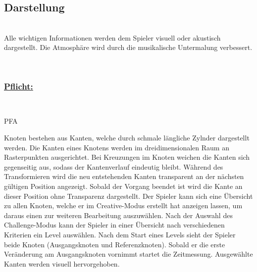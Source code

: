 %
%


\subsection{Darstellung}

%
%
\renewcommand{\K}{}
%
%

~\\
Alle wichtigen Informationen werden dem Spieler visuell oder akustisch dargestellt. Die Atmosphäre wird durch die musikalische Untermalung verbessert.

\\

%
%
\subsubsection*{\underline{Pflicht:}}~\\

\begin{ids}{\gls{PFA\K}}

	\id[ 280] Knoten bestehen aus Kanten, welche durch schmale längliche Zylnder dargestellt werden.
	\id[ 290] Die Kanten eines Knotens werden im dreidimensionalen Raum an Rasterpunkten ausgerichtet.
	\id[ 300] Bei Kreuzungen im Knoten weichen die Kanten sich gegenseitig aus, sodass der Kantenverlauf eindeutig bleibt.
	\id[ 310] Während des Transformieren wird die neu entstehenden Kanten transparent an der nächsten gültigen Position angezeigt. Sobald der Vorgang beendet ist wird die Kante an dieser Position ohne Transparenz dargestellt.
	\id[ 320] Der Spieler kann sich eine Übersicht zu allen Knoten, welche er im Creative-Modus erstellt hat anzeigen lassen, um daraus einen zur weiteren Bearbeitung auszuwählen.
	\id[ 330] Nach der Auswahl des Challenge-Modus kann der Spieler in einer Übersicht nach verschiedenen Kriterien ein Level auswählen.
	\id[ 340] Nach dem Start eines Levels sieht der Spieler beide Knoten (Ausgangsknoten und Referenzknoten). Sobald er die erste Veränderung am Ausgangsknoten vornimmt startet die Zeitmessung.
	\id[ 350] Ausgewählte Kanten werden visuell hervorgehoben.
	
	
 	
 	
	
\end{ids}

~\\



